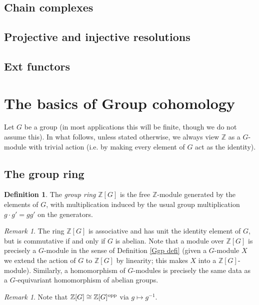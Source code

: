 \documentclass[11pt]{amsart}
\numberwithin{equation}{section}
\theoremstyle{remark}
\newtheorem{remark}[equation]{Remark}
\theoremstyle{remark}
\theoremstyle{remark}
\theoremstyle{definition}
\theoremstyle{definition}
\theoremstyle{definition}
\newtheorem{defi}[equation]{Definition}
\theoremstyle{definition}
\theoremstyle{definition}
\theoremstyle{definition}
\begin{document}
\subsection{Chain complexes}

\subsection{Projective and injective resolutions}

\subsection{Ext functors}

\section{The basics of Group cohomology}

Let $G$ be a group (in most applications this will be finite, though we do not assume this). In what follows, unless stated otherwise, we always view $\mathbb{Z}$ as a $G$-module with trivial action (i.e. by making every element of $G$ act as the identity).

\subsection{The group ring}

\begin{defi}
The \textit{group ring} $\mathbb{Z}[G]$ is the free $\mathbb{Z}$-module generated by the elements of $G$, with multiplication induced by the usual group multiplication $g\cdot g'=gg'$ on the generators. 
\end{defi}

\begin{remark}
The ring $\mathbb{Z}[G]$ is associative and has unit the identity element of $G$, but is commutative if and only if $G$ is abelian. Note that a module over $\mathbb{Z}[G]$ is precisely a $G$-module in the sense of Definition \ref{Ggp defi} (given a $G$-module  $X$ we extend the action of $G$ to $\mathbb{Z}[G]$ by linearity; this makes $X$ into a $\mathbb{Z}[G]$-module). Similarly, a homomorphism of $G$-modules is precisely the same data as a $G$-equivariant homomorphism of abelian groups.
\end{remark}

\begin{remark} \label{antipode}
Note that $\mathbb{Z}[G]\cong \mathbb{Z}[G]^{\textup{opp}}$ via $g\mapsto g^{-1}$. 
\end{remark}
\end{document}
